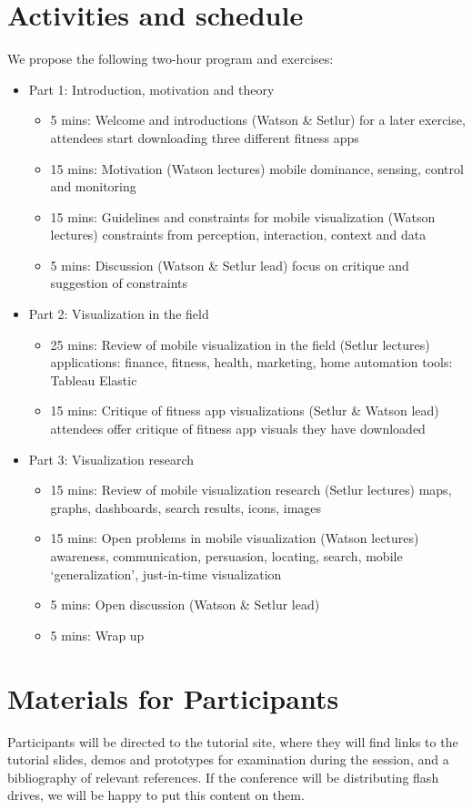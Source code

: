 \documentclass{sigchi-ext}
\begin{document}
\section{Activities and schedule}
We propose the following two-hour program and exercises:
\begin{itemize}
\item Part 1: Introduction, motivation and theory
\begin{itemize}
\item 5 mins: Welcome and introductions (Watson \& Setlur)
for a later exercise, attendees start downloading three different fitness apps
\item 15 mins: Motivation (Watson lectures)
mobile dominance, sensing, control and monitoring
\item 15 mins: Guidelines and constraints for mobile visualization (Watson lectures)
constraints from perception, interaction, context and data
\item 5 mins: Discussion (Watson \& Setlur lead)
focus on critique and suggestion of constraints
\end{itemize}
\item Part 2: Visualization in the field
\begin{itemize}
\item 25 mins: Review of mobile visualization in the field (Setlur lectures)
applications: finance, fitness, health, marketing, home automation
tools: Tableau Elastic
\item 15 mins: Critique of fitness app visualizations (Setlur \& Watson lead)
attendees offer critique of fitness app visuals they have downloaded
\end{itemize}
\item Part 3: Visualization research
\begin{itemize}
\item 15  mins: Review of mobile visualization research (Setlur lectures)
maps, graphs, dashboards, search results, icons, images
\item 15 mins: Open problems in mobile visualization (Watson lectures)
awareness, communication, persuasion, locating, search, mobile `generalization', just-in-time visualization
\item 5 mins: Open discussion (Watson \& Setlur lead)
\item 5 mins: Wrap up
\end{itemize}
\end{itemize}

\section{Materials for Participants}
Participants will be directed to the tutorial site, where they will find links to the tutorial slides, demos and prototypes for examination during the session, and a bibliography of relevant references. If the conference will be distributing flash drives, we will be happy to put this content on them.
\end{document}

